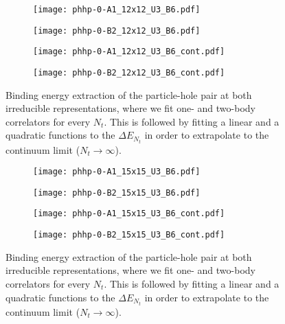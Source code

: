 \begin{figure}
  \begin{subfigure}{.5\textwidth}
    \centering
    \texttt{[image: phhp-0-A1\_12x12\_U3\_B6.pdf]}
  \end{subfigure}%
  \begin{subfigure}{.5\textwidth}
    \centering
    \texttt{[image: phhp-0-B2\_12x12\_U3\_B6.pdf]}
  \end{subfigure}
  \begin{subfigure}{.5\textwidth}
      \centering
      \texttt{[image: phhp-0-A1\_12x12\_U3\_B6\_cont.pdf]}
  \end{subfigure}
  \begin{subfigure}{.5\textwidth}
      \centering
      \texttt{[image: phhp-0-B2\_12x12\_U3\_B6\_cont.pdf]}
  \end{subfigure}
  \caption{Binding energy extraction of the particle-hole pair at both irreducible representations, where we fit one- and two-body correlators for every $N_t$. This is followed by fitting a linear and a quadratic functions to the $\Delta E_{N_t}$ in order to extrapolate to the continuum limit ($N_t\to\infty$).}
  \label{fig:fig3}
\end{figure}

\begin{figure}
  \begin{subfigure}{.5\textwidth}
    \centering
    \texttt{[image: phhp-0-A1\_15x15\_U3\_B6.pdf]}
  \end{subfigure}%
  \begin{subfigure}{.5\textwidth}
    \centering
    \texttt{[image: phhp-0-B2\_15x15\_U3\_B6.pdf]}
  \end{subfigure}
  \begin{subfigure}{.5\textwidth}
      \centering
      \texttt{[image: phhp-0-A1\_15x15\_U3\_B6\_cont.pdf]}
  \end{subfigure}
  \begin{subfigure}{.5\textwidth}
      \centering
      \texttt{[image: phhp-0-B2\_15x15\_U3\_B6\_cont.pdf]}
  \end{subfigure}
  \caption{Binding energy extraction of the particle-hole pair at both irreducible representations, where we fit one- and two-body correlators for every $N_t$. This is followed by fitting a linear and a quadratic functions to the $\Delta E_{N_t}$ in order to extrapolate to the continuum limit ($N_t\to\infty$).}
  \label{fig:fig4}
\end{figure}

